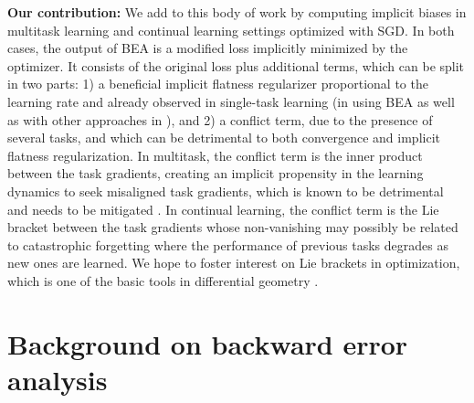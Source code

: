 \documentclass{article}
\begin{document}
{\bf Our contribution:} We add to this body of work by computing implicit biases in multitask learning \cite{wang2023comprehensive_survey} and continual learning \cite{soutifcormerais2023comprehensive, lange2023continual} settings optimized with SGD. In both cases, the output of BEA is a modified loss implicitly minimized by the optimizer. It consists of the original loss plus additional terms, which can be split in two parts: 1) a beneficial implicit flatness regularizer proportional to the learning rate and already observed in single-task learning (in \cite{barrett2021implicit,smith2021on} using BEA as well as with other approaches in \cite{vardi2021implicit,damian2021label,ma2021linear_stability_of_sgd}), and 2) a conflict term, due to the presence of several tasks, and which can be detrimental to both convergence and implicit flatness regularization. In multitask, the conflict term is the inner product between the task gradients, creating an implicit propensity in the learning dynamics to seek misaligned task gradients, which is known to be detrimental and needs to be mitigated \cite{yu2020gradient_surgery,wang2021gradient_vaccine,lee2022sequential}. In continual learning, the conflict term is the Lie bracket \cite{lee2012smooth_manifolds} between the task gradients whose non-vanishing may possibly be related to catastrophic forgetting \cite{soutifcormerais2023comprehensive,lange2023continual} where the performance of previous tasks degrades as new ones are learned. We hope to foster interest on Lie brackets in optimization, which is one of the basic tools in differential geometry \cite{lee2012smooth_manifolds}.

\section{Background on backward error analysis}
\label{section:bea}
\end{document}
